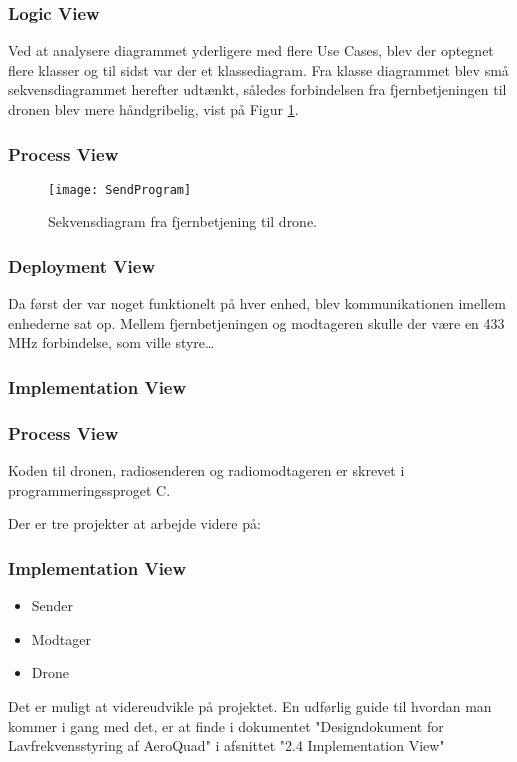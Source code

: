 \documentclass[Main]{subfiles}
\begin{document}


\subsubsection*{Logic View}
Ved at analysere diagrammet yderligere med flere Use Cases, blev der optegnet flere klasser og til sidst var der et klassediagram. 
Fra klasse diagrammet blev små sekvensdiagrammet herefter udtænkt, således forbindelsen fra fjernbetjeningen til dronen blev mere håndgribelig, vist på Figur \ref{Fig:sendProgram}.
\subsubsection*{Process View}

\begin{figure}[H]
\centering
\texttt{[image: SendProgram]}
\caption{Sekvensdiagram fra fjernbetjening til drone.}
\label{Fig:sendProgram}
\end{figure}

\subsubsection*{Deployment View}
Da først der var noget funktionelt på hver enhed, blev kommunikationen imellem enhederne sat op.
Mellem fjernbetjeningen og modtageren skulle der være en 433 MHz forbindelse, som ville styre\dots{}
\subsubsection*{Implementation View}

\subsubsection*{Process View}
Koden til dronen, radiosenderen og radiomodtageren er skrevet i programmeringssproget C.

Der er tre projekter at arbejde videre på:

\subsubsection*{Implementation View}
\begin{itemize}
\item Sender
\item Modtager
\item Drone
\end{itemize}

Det er muligt at videreudvikle på projektet.
En udførlig guide til hvordan man kommer i gang med det, er at finde i  dokumentet "Designdokument for Lavfrekvensstyring af AeroQuad" i afsnittet "2.4 Implementation View" 
\end{document}
